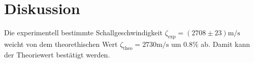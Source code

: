 \section{Diskussion}
\label{sec:diskussion}

Die experimentell bestimmte Schallgeschwindigkeit $\zeta_{\text{exp}} = \left(2708 \pm 23\right) \si{\meter \per \second}$ weicht von dem 
theorethischen Wert $\zeta_{\text{theo}} = 2730 \si{\meter \per \second}$ um $0.8 \%$ ab. Damit kann der Theoriewert bestätigt werden.

